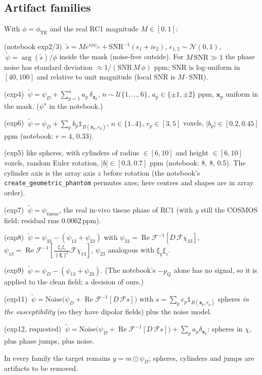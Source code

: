 \documentclass[11pt]{article}
\newcommand{\F}{\mathcal{F}}
\newcommand{\bx}{\bm{x}}
\newcommand{\bxi}{\bm{\xi}}
\newcommand{\ind}{\mathds{1}}
\newcommand{\norm}[1]{\lVert #1\rVert}
\newcommand{\abs}[1]{\lvert #1\rvert}
\newcommand{\Real}{\operatorname{Re}}
\newcommand{\code}[1]{\texttt{#1}}
\theoremstyle{remark}
\begin{document}
\subsection{Artifact families}
With $\phi=\phi_{\mathrm{TE}}$ and the real RC1 magnitude $M\in[0,1]$:
\begin{description}[leftmargin=1.2em,itemsep=2pt]
\item[noise] (notebook exp2/3) $\ \tilde s=M e^{i\phi\psi_D}+\mathrm{SNR}^{-1}(\epsilon_1+i\epsilon_2)$, $\epsilon_{1,2}\sim\mathcal N(0,1)$, $\ \tilde\psi=\arg(\tilde s)/\phi$ inside the mask (noise-free outside). For $M\,\mathrm{SNR}\gg1$ the phase noise has standard deviation $\approx1/(\mathrm{SNR}\,M\,\phi)$ ppm; $\mathrm{SNR}$ is log-uniform in $[40,100]$ and relative to unit magnitude (local SNR is $M\cdot\mathrm{SNR}$).
\item[jumps] (exp4) $\ \tilde\psi=\psi_D+\sum_{p=1}^{n}a_p\,\delta_{\bx_p}$, $n\sim\mathcal U\{1,\dots,6\}$, $a_p\in\{\pm1,\pm2\}$ ppm, $\bx_p$ uniform in the mask. ($\psi^\star$ in the notebook.)
\item[spheres\_phase] (exp6) $\ \tilde\psi=\psi_D+\sum_pb_p\ind_{B(\bx_p,r_p)}$, $n\in\{1..4\}$, $r_p\in[3,5]$ voxels, $\abs{b_p}\in[0.2,0.45]$ ppm (notebook: $r=4$, $0.33$).
\item[cylinders] (exp5) like spheres, with cylinders of radius $\in[6,10]$ and height $\in[6,10]$ voxels, random Euler rotation, $\abs b\in[0.3,0.7]$ ppm (notebook: 8, 8, 0.5). The cylinder axis is the array axis $z$ before rotation (the notebook's \code{create\_geometric\_phantom} permutes axes; here centres and shapes are in array order).
\item[tissue] (exp7) $\ \tilde\psi=\psi_{\text{tissue}}$, the real in-vivo tissue phase of RC1 (with $y$ still the COSMOS field; residual rms $0.0062$\,ppm).
\item[sti] (exp8) $\ \tilde\psi=\psi_{33}-(\psi_{13}+\psi_{23})$ with $\psi_{33}=\Real\F^{-1}[D\,\F\chi_{33}]$, $\psi_{13}=\Real\F^{-1}[\tfrac{\xi_x\xi_z}{\norm{\bxi}^2}\F\chi_{13}]$, $\psi_{23}$ analogous with $\xi_y\xi_z$.
\item[offdiag] (exp9) $\ \tilde\psi=\psi_D-(\psi_{13}+\psi_{23})$. (The notebook's $-p_Q$ alone has no signal, so it is applied to the clean field; a decision of ours.)
\item[spheres\_chi] (exp11) $\ \tilde\psi=\mathrm{Noise}\big(\psi_D+\Real\F^{-1}[D\,\F s]\big)$ with $s=\sum_pc_p\ind_{B(\bx_p,r_p)}$ spheres \emph{in the susceptibility} (so they have dipolar fields) plus the noise model.
\item[combo] (exp12, requested) $\ \tilde\psi=\mathrm{Noise}\big(\psi_D+\Real\F^{-1}[D\,\F s]\big)+\sum_pa_p\delta_{\bx_p}$: spheres in $\chi$, plus phase jumps, plus noise.
\end{description}
In every family the target remains $y=m\odot\psi_D$; spheres, cylinders and jumps are artifacts to be removed.
\end{document}
